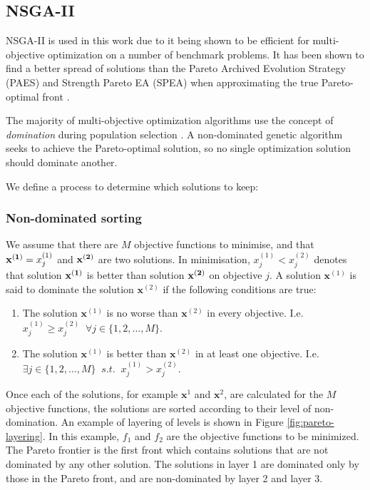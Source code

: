 \documentclass[10pt, conference, compsocconf]{IEEEtran}
\begin{document}
\subsection{NSGA-II}

NSGA-II is used in this work due to it being shown to be efficient for multi-objective optimization on a number of benchmark problems. It has been shown to find a better spread of solutions than the Pareto Archived Evolution Strategy (PAES) \cite{Knowles1999} and Strength Pareto EA (SPEA) \cite{Zitzler2006} when approximating the true Pareto-optimal front \cite{Valkanas2014}.

The majority of multi-objective optimization algorithms use the concept of \emph{domination} during population selection \cite{Burke2014}. A non-dominated genetic algorithm seeks to achieve the Pareto-optimal solution, so no single optimization solution should dominate another.

We define a process to determine which solutions to keep:

\subsubsection{Non-dominated sorting}
We assume that there are $M$ objective functions to minimise, and that ${\bf x^{(1)}} = x_j^{(1)}$ and $\bf x^{(2)}$ are two solutions. In minimisation, $x_j^{(1)}<x_j^{(2)}$ denotes that solution $\bf x^{(1)}$ is better than solution $\bf x^{(2)}$ on objective $j$. A solution $\mathbf{x}^{(1)}$ is said to dominate the solution $\mathbf{x}^{(2)}$ if the following conditions are true:

\begin{enumerate}
  \item The solution $\mathbf{x}^{(1)}$ is no worse than $\mathbf{x}^{(2)}$ in every objective. I.e. $x^{(1)}_j \geq x^{(2)}_j \;\;  \forall j \in\{1,2,\ldots,M\}$.
  \item The solution $\mathbf{x}^{(1)}$ is better than $\mathbf{x}^{(2)}$ in at least one objective. I.e. $\exists {j}\in \{ 1,2,\ldots,M\} \;\; s.t. \;\;x^{(1)}_j > x^{(2)}_j$.
\end{enumerate}

Once each of the solutions, for example $\mathbf{x}^1$ and $\mathbf{x}^2$, are calculated for the $M$ objective functions, the solutions are sorted according to their level of non-domination. An example of layering of levels is shown in Figure \ref{fig:pareto-layering}. In this example, $f_1$ and $f_2$ are the objective functions to be minimized. The Pareto frontier is the first front which contains solutions that are not dominated by any other solution. The solutions in layer 1 are dominated only by those in the Pareto front, and are non-dominated by layer 2 and layer 3. 
\end{document}
